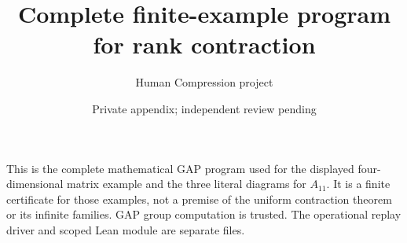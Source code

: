 \documentclass[a4paper,10pt]{article}
\title{Complete finite-example program for rank contraction}
\author{Human Compression project}\date{Private appendix; independent review pending}
\begin{document}
\maketitle
This is the complete mathematical GAP program used for the displayed
four-dimensional matrix example and the three literal diagrams for $A_{11}$.
It is a finite certificate for those examples, not a premise of the uniform
contraction theorem or its infinite families. GAP group computation is trusted.
The operational replay driver and scoped Lean module are separate files.
\end{document}
